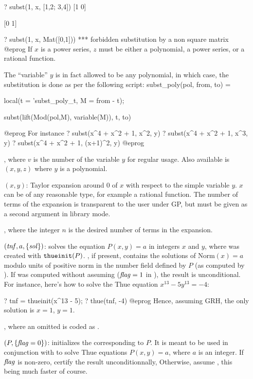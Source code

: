 \bprog
? subst(1, x, [1,2; 3,4])
[1 0]

[0 1]

? subst(1, x, Mat([0,1]))
  ***   forbidden substitution by a non square matrix
@eprog
\noindent If $x$ is a power series, $z$ must be either a polynomial, a power
series, or a rational function.

The ``variable'' $y$ is in fact allowed to be any polynomial, in which case,
the substitution is done as per the following script:
\bprog
   subst_poly(pol, from, to) =
   { local(t = 'subst_poly_t, M = from - t);

     subst(lift(Mod(pol,M), variable(M)), t, to)
   }
@eprog
\noindent For instance
\bprog
? subst(x^4 + x^2 + 1, x^2, y)
? subst(x^4 + x^2 + 1, x^3, y)
? subst(x^4 + x^2 + 1, (x+1)^2, y)
@eprog

, where $v$ is the number of the variable $y$ for regular
usage. Also available is $(x,y,z)$ where $y$ is a 
polynomial.

$(x,y)$: Taylor expansion around $0$ of $x$ with respect
to\label{se:taylor}
the simple variable $y$. $x$ can be of any reasonable type, for example a
rational function. The number of terms of the expansion is transparent to the
user under GP, but must be given as a second argument in library mode.

, where the  integer $n$ is the desired number of
terms in the expansion.

$(\hbox{\it tnf\/},a,\{\hbox{\it sol\/}\})$: solves the equation
$P(x,y)=a$ in integers $x$ and $y$, where  was created with
${\tt thueinit}(P)$. , if present, contains the solutions of
$\text{Norm}(x)=a$ modulo units of positive norm in the number field
defined by $P$ (as computed by ). If  was
computed without assuming  ($\hbox{\it f\kern0pt lag\/}=1$ in ), the
result is unconditional. For instance, here's how to solve the Thue
equation $x^{13} - 5y^{13} = - 4$:

\bprog
? tnf = thueinit(x^13 - 5);
? thue(tnf, -4)
@eprog
Hence, assuming GRH, the only solution is $x = 1$, $y = 1$.

, where an omitted  is coded
as .

$(P,\{\hbox{\it f\kern0pt lag\/}=0\})$: initializes the 
corresponding to $P$. It is meant to be used in conjunction with 
to solve Thue equations $P(x,y) = a$, where $a$ is an integer. If $\hbox{\it f\kern0pt lag\/}$ is
non-zero, certify the result unconditionnally, Otherwise, assume ,
this being much faster of course.

